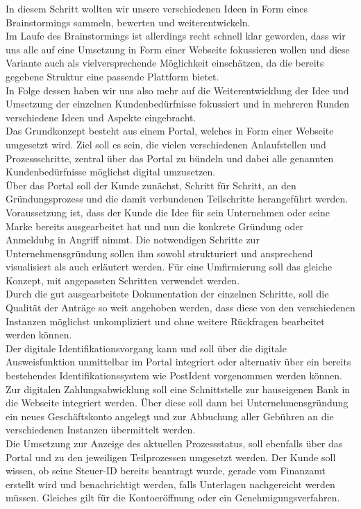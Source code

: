 In diesem Schritt wollten wir unsere verschiedenen Ideen in Form eines Brainstormings sammeln, bewerten und weiterentwickeln.\\
Im Laufe des Brainstormings ist allerdings recht schnell klar geworden, dass wir uns alle auf eine Umsetzung in Form einer Webseite fokussieren wollen und diese Variante auch als vielversprechende Möglichkeit einschätzen, da die bereits gegebene Struktur eine passende Plattform bietet.\\
In Folge dessen haben wir uns also mehr auf die Weiterentwicklung der Idee und Umsetzung der einzelnen Kundenbedürfnisse fokussiert und in mehreren Runden verschiedene Ideen und Aspekte eingebracht.\\
Das Grundkonzept besteht aus einem Portal, welches in Form einer Webseite umgesetzt wird. Ziel soll es sein, die vielen verschiedenen Anlaufstellen und Prozessschritte, zentral über das Portal zu bündeln und dabei alle genannten Kundenbedürfnisse möglichst digital umzusetzen.\\
Über das Portal soll der Kunde zunächst, Schritt für Schritt, an den Gründungsprozess und die damit verbundenen Teilschritte herangeführt werden. Voraussetzung ist, dass der Kunde die Idee für sein Unternehmen oder seine Marke bereits ausgearbeitet hat und nun die konkrete Gründung oder Anmeldubg in Angriff nimmt. Die notwendigen Schritte zur Unternehmensgründung sollen ihm sowohl strukturiert und ansprechend visualisiert als auch erläutert werden. Für eine Umfirmierung soll das gleiche Konzept, mit angepassten Schritten verwendet werden.\\
Durch die gut ausgearbeitete Dokumentation der einzelnen Schritte, soll die Qualität der Anträge so weit angehoben werden, dass diese von den verschiedenen Instanzen möglichst unkompliziert und ohne weitere Rückfragen bearbeitet werden können.\\
Der digitale Identifikationsvorgang kann und soll über die digitale Ausweisfunktion unmittelbar im Portal integriert oder alternativ über ein bereits bestehendes Identifikationssystem wie PostIdent vorgenommen werden können. Zur digitalen Zahlungsabwicklung soll eine Schnittstelle zur hauseigenen Bank in die Webseite integriert werden. Über diese soll dann bei Unternehmensgründung ein neues Geschäftskonto angelegt und zur Abbuchung aller Gebühren an die verschiedenen Instanzen übermittelt werden.\\
Die Umsetzung zur Anzeige des aktuellen Prozessstatus, soll ebenfalls über das Portal und zu den jeweiligen Teilprozessen umgesetzt werden. Der Kunde soll wissen, ob seine Steuer-ID bereits beantragt wurde, gerade vom Finanzamt erstellt wird und benachrichtigt werden, falls Unterlagen nachgereicht werden müssen. Gleiches gilt für die Kontoeröffnung oder ein Genehmigungsverfahren.\\
